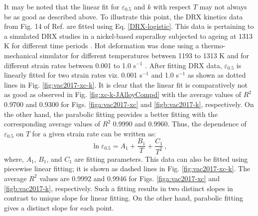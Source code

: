 \documentclass[a4paper, 11pt, dvipsnames]{article}
\begin{document}
It may be noted that the linear fit for $\varepsilon_{0.5}$ and $k$ with respect $T$ may not always be as good as described above. To illustrate this point, the DRX kinetics data from Fig. 14 of Ref. \cite{X1} are fitted using Eq. \eqref{DRX-logistic}. This data is pertaining to a simulated DRX studies in a nickel-based superalloy subjected to ageing at 1313 K for different time periods \cite{X1}. Hot deformation was done using a thermo-mechanical simulator for different temperatures between 1193 to 1313 K and for different strain rates between 0.001 to 1.0 s$^{-1}$ \cite{X1}. After fitting DRX data, $\varepsilon_{0.5}$ is linearly fitted for two strain rates viz. 0.001 s$^{-1}$ and 1.0 s$^{-1}$ as shown as dotted lines in Fig. \ref{fig:vac2017-xc-k}. It is clear that the linear fit is comparatively not as good as observed in Fig. \ref{fig:xc-k-JAlloyCompd} with the average values of $R^2$ 0.9700 and 0.9300 for Figs. \ref{figa:vac2017-xc} and \ref{figb:vac2017-k}, respectively. On the other hand, the parabolic fitting provides a better fitting with the corresponding average values of $R^2$ 0.9990 and 0.9960. Thus, the dependence of $\varepsilon_{0.5}$ on $T$ for a given strain rate can be written as:
\begin{equation}\label{parabolic-fit}
\ln\varepsilon_{0.5} = A_1 + \frac{B_1}{T} + \frac{C_1}{T^2} \, ,
\end{equation}
where, $A_1$, $B_1$, and $C_1$ are fitting parameters. This data can also be fitted using piecewise linear fitting; it is shown as dashed lines in Fig. \ref{fig:vac2017-xc-k}. The average $R^2$ values are 0.9992 and 0.9946 for Figs. \ref{figa:vac2017-xc} and \ref{figb:vac2017-k}, respectively. Such a fitting results in two distinct slopes in contrast to unique slope for linear fitting. On the other hand, parabolic fitting gives a distinct slope for each point.
\end{document}
